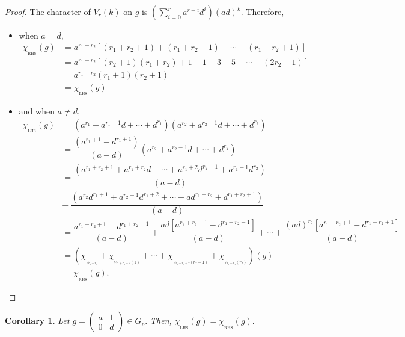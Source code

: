 \documentclass[10pt, reqno]{amsart}
\def\Gp{{G_p}}
\def\CL{{\chi_{_{\mathrm{LHS}}}}}
\def\CR{{\chi_{_{\mathrm{RHS}}}}}
\numberwithin{equation}{section}
\newtheorem{corollary}[theorem]{Corollary}%
\theoremstyle{remark}
\begin{document}
	\begin{proof}
		The character of $V_r(k)$ on $g$ is $\left(\sum\limits_{i=0}^{r}a^{r-i}d^i\right)\left(ad\right)^k.$ Therefore,
		\begin{itemize}
			\item[] when $a=d,$
			\begin{align*}
				\CR(g)&= a^{r_1+r_2}[(r_1+r_2+1)+(r_1+r_2-1)+\cdots+(r_1-r_2+1)]\\
				&= a^{r_1+r_2}[(r_2+1)(r_1+r_2)+1-1-3-5-\cdots-(2r_2-1)]\\
				&= a^{r_1+r_2}(r_1+1)(r_2+1)\\
				&=\CL(g)
			\end{align*}
			
			\item[] and when $a\neq d,$
			\begin{align*}				
				\CL(g)&=\left(a^{r_1}+a^{{r_1}-1}d+\cdots + d^{r_1}\right)\left(a^{r_2}+a^{{r_2}-1}d+\cdots +d^{r_2}\right)\\				
				&= \dfrac{(a^{r_1+1}-d^{r_1+1})}{(a-d)}\left(a^{r_2}+a^{{r_2}-1}d+\cdots +d^{r_2}\right)\\				&=\dfrac{\left(a^{r_1+r_2+1}+a^{r_1+r_2}d+\cdots+a^{r_1+2}d^{r_2-1}+a^{r_1+1}d^{r_2}\right)}{(a-d)}\\
				&-~\dfrac{\left(a^{r_2}d^{r_1+1}+a^{r_2-1}d^{r_1+2}+\cdots+ad^{r_1+r_2}+d^{r_1+r_2+1}\right)}{(a-d)}\\
				&=\dfrac{a^{r_1+r_2+1}-d^{r_1+r_2+1}}{(a-d)}+\dfrac{ad[a^{r_1+r_2-1}-d^{r_1+r_2-1}]}{(a-d)}+\cdots+\dfrac{(ad)^{r_2}[a^{r_1-r_2+1}-d^{r_1-r_2+1}]}{(a-d)}\\
				&= \left(\chi_{_{V_{{r_1}+{r_2}}}}+
				\chi_{_{V_{{r_1}+{r_2}-2}(1)}}+\cdots+\chi_{_{V_{{r_1}-{r_2}+2}({r_2}-1)}}+\chi_{_{V_{{r_1}-{r_2}}(r_2)}}\right)(g)\\
				&=\CR(g).
			\end{align*} \end{itemize}
	\end{proof}
	
	
	\begin{corollary}\label{C1}
		Let $g=\left(
		\begin{matrix}
			a & 1\\
			0 & d
		\end{matrix}
		\right)\in \Gp.$ Then, $\CL(g)=\CR(g).$
	\end{corollary}
	
\end{document}
